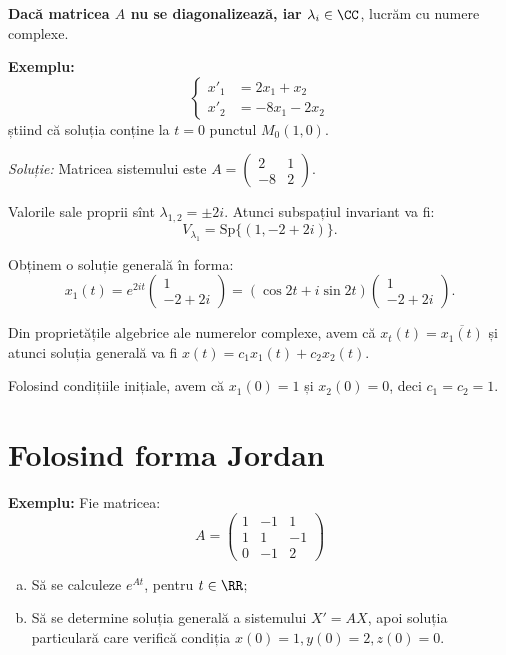 \textbf{Dacă matricea $A$ nu se diagonalizează, iar $\lambda_i \in \CC$}, lucrăm cu numere complexe.

\textbf{Exemplu:}
\[
  \begin{cases}
    x'_1 &= 2x_1 + x_2 \\
    x'_2 &= -8x_1 - 2x_2
  \end{cases}
\]
știind că soluția conține la $t = 0$ punctul $M_0(1, 0)$.

\emph{Soluție:} Matricea sistemului este $A = \begin{pmatrix} 2 & 1 \\ -8 & 2 \end{pmatrix}$.

Valorile sale proprii sînt $\lambda_{1,2} = \pm 2i$. Atunci subspațiul invariant va fi:
\[
  V_{\lambda_1} = \mathrm{Sp} \{(1, -2 + 2i )\}.
\]

Obținem o soluție generală în forma:
\[
  x_1(t) = e^{2it} \begin{pmatrix} 1 \\ -2 + 2i \end{pmatrix} = %
  (\cos 2t + i \sin 2t) \begin{pmatrix} 1 \\ -2 + 2i \end{pmatrix}.
\]

Din proprietățile algebrice ale numerelor complexe, avem că $x_t(t) = \overline{x_1(t)}$ și atunci
soluția generală va fi $x(t) = c_1 x_1(t) + c_2 x_2(t)$.

Folosind condițiile inițiale, avem că $x_1(0) = 1$ și $x_2(0) = 0$, deci $c_1 = c_2 = 1$.


\section{Folosind forma Jordan}
\label{sec:jordan}

\textbf{Exemplu:} Fie matricea:
\[
  A = \begin{pmatrix}
    1 & -1 & 1 \\
    1 & 1 & -1 \\
    0 & -1 & 2 
  \end{pmatrix}
\]
\begin{enumerate}[(a)]
\item Să se calculeze $e^{At}$, pentru $t \in \RR$;
\item Să se determine soluția generală a sistemului $X' = AX$, apoi soluția particulară
  care verifică condiția $x(0) = 1, y(0) = 2, z(0) = 0$.
\end{enumerate}

